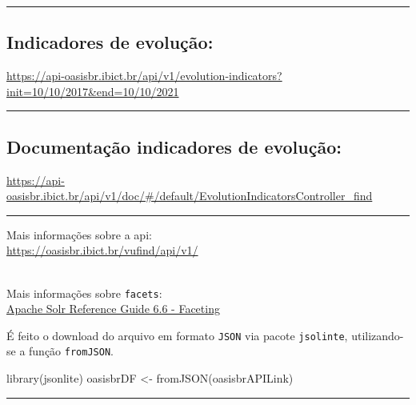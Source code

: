 \documentclass[
]{article}
\newenvironment{Shaded}{\begin{snugshade}}{\end{snugshade}}
\newcommand{\FunctionTok}[1]{\textcolor[rgb]{0.00,0.00,0.00}{#1}}
\newcommand{\NormalTok}[1]{#1}
\newcommand{\OtherTok}[1]{\textcolor[rgb]{0.56,0.35,0.01}{#1}}
\begin{document}
\begin{center}\rule{0.5\linewidth}{0.5pt}\end{center}

\hypertarget{indicadores-de-evoluuxe7uxe3o}{%
\subsection{Indicadores de
evolução:}\label{indicadores-de-evoluuxe7uxe3o}}

\url{https://api-oasisbr.ibict.br/api/v1/evolution-indicators?init=10/10/2017\&end=10/10/2021}

\begin{center}\rule{0.5\linewidth}{0.5pt}\end{center}

\hypertarget{documentauxe7uxe3o-indicadores-de-evoluuxe7uxe3o}{%
\subsection{Documentação indicadores de
evolução:}\label{documentauxe7uxe3o-indicadores-de-evoluuxe7uxe3o}}

\url{https://api-oasisbr.ibict.br/api/v1/doc/\#/default/EvolutionIndicatorsController_find}

\begin{center}\rule{0.5\linewidth}{0.5pt}\end{center}

Mais informações sobre a api:\\
\url{https://oasisbr.ibict.br/vufind/api/v1/}\strut \\
Mais informações sobre \texttt{facets}:\\
\href{\%60https://solr.apache.org/guide/6_6/faceting.html\%60}{Apache
Solr Reference Guide 6.6 - Faceting}

É feito o download do arquivo em formato \texttt{JSON} via pacote
\texttt{jsolinte}, utilizando-se a função \texttt{fromJSON}.

\begin{Shaded}
\begin{Highlighting}[]
\FunctionTok{library}\NormalTok{(jsonlite)}
\NormalTok{oasisbrDF }\OtherTok{\textless{}{-}} \FunctionTok{fromJSON}\NormalTok{(oasisbrAPILink)}
\end{Highlighting}
\end{Shaded}

\begin{center}\rule{0.5\linewidth}{0.5pt}\end{center}
\end{document}
